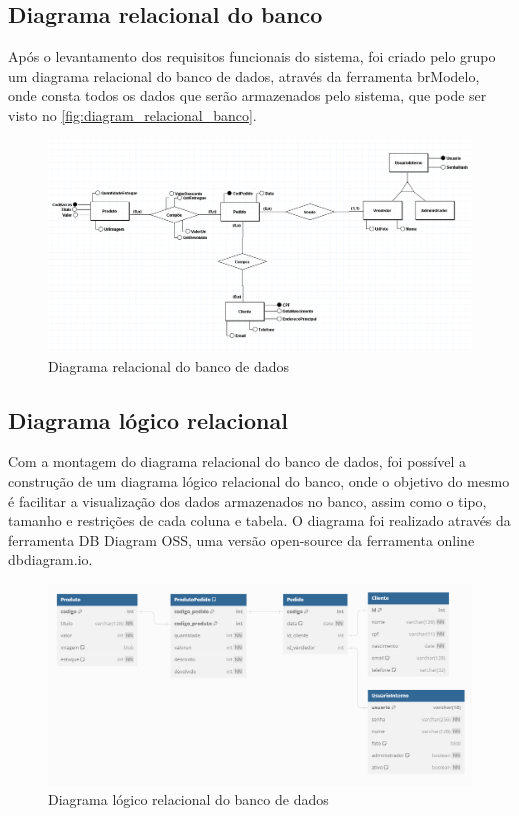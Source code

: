 \documentclass[serif, english, brazilian, oneside]{uffstex}
\begin{document}
\subsection{Diagrama relacional do banco}

Após o levantamento dos requisitos funcionais do sistema, foi criado pelo grupo um diagrama relacional do banco de dados, através da ferramenta brModelo, onde consta todos os dados que serão armazenados pelo sistema, que pode ser visto no \autoref{fig:diagram_relacional_banco}.

\begin{figure}[!htpb]
    \centering
    \caption{Diagrama relacional do banco de dados}
    \label{fig:diagram_relacional_banco}
    \includegraphics[width=\linewidth]{imagens/diagrama_relacional_bd.png}
\end{figure}

\subsection{Diagrama lógico relacional}

Com a montagem do diagrama relacional do banco de dados, foi possível a construção de um diagrama lógico relacional do banco, onde o objetivo do mesmo é facilitar a visualização dos dados armazenados no banco, assim como o tipo, tamanho e restrições de cada coluna e tabela. O diagrama foi realizado através da ferramenta DB Diagram OSS, uma versão open-source da ferramenta online dbdiagram.io.

\begin{figure}[!htpb]
    \centering
    \caption{Diagrama lógico relacional do banco de dados}
    \label{fig:diagram_relacional_banco}
    \includegraphics[width=\linewidth]{imagens/diagrama_logico_relacional.png}
\end{figure}
\end{document}
